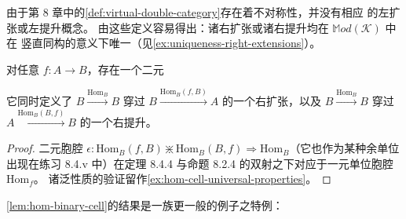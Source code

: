 由于第 8 章中的\cref{def:virtual-double-category}存在着不对称性，并没有相应
的左扩张或左提升概念。
由这些定义容易得出：诸右扩张或诸右提升均在 $\mathbb{M}od(\mathcal{K})$ 中在
竖直同构的意义下唯一（见\cref{ex:uniqueness-right-extensions}）。

\begin{lemma}\label{lem:hom-binary-cell}
对任意\trFunctor{} $f\colon A\to B$，存在一个二元\trCell{}
\begin{center}
\end{center}
它同时定义了 $B\xrightarrow{\mathrm{Hom}_{B}}B$ 穿过
$B\xrightarrow{\mathrm{Hom}_{B}(f,B)}A$ 的一个右扩张，以及
$B\xrightarrow{\mathrm{Hom}_{B}}B$ 穿过
$A\xrightarrow{\mathrm{Hom}_{B}(B,f)}B$ 的一个右提升。
\end{lemma}

\begin{proof}
二元胞腔 $\epsilon\colon \mathrm{Hom}_{B}(f,B)\divideontimes \mathrm{Hom}_{B}(B,f)\Rightarrow \mathrm{Hom}_{B}$（它也作为某种余单位出现在练习 8.4.v 中）在定理
8.4.4 与命题 8.2.4 的双射之下对应于一元单位胞腔 $\mathrm{Hom}_{f}$。
诸泛性质的验证留作\cref{ex:hom-cell-universal-properties}。
\end{proof}

\cref{lem:hom-binary-cell}的结果是一族更一般的例子之特例：

